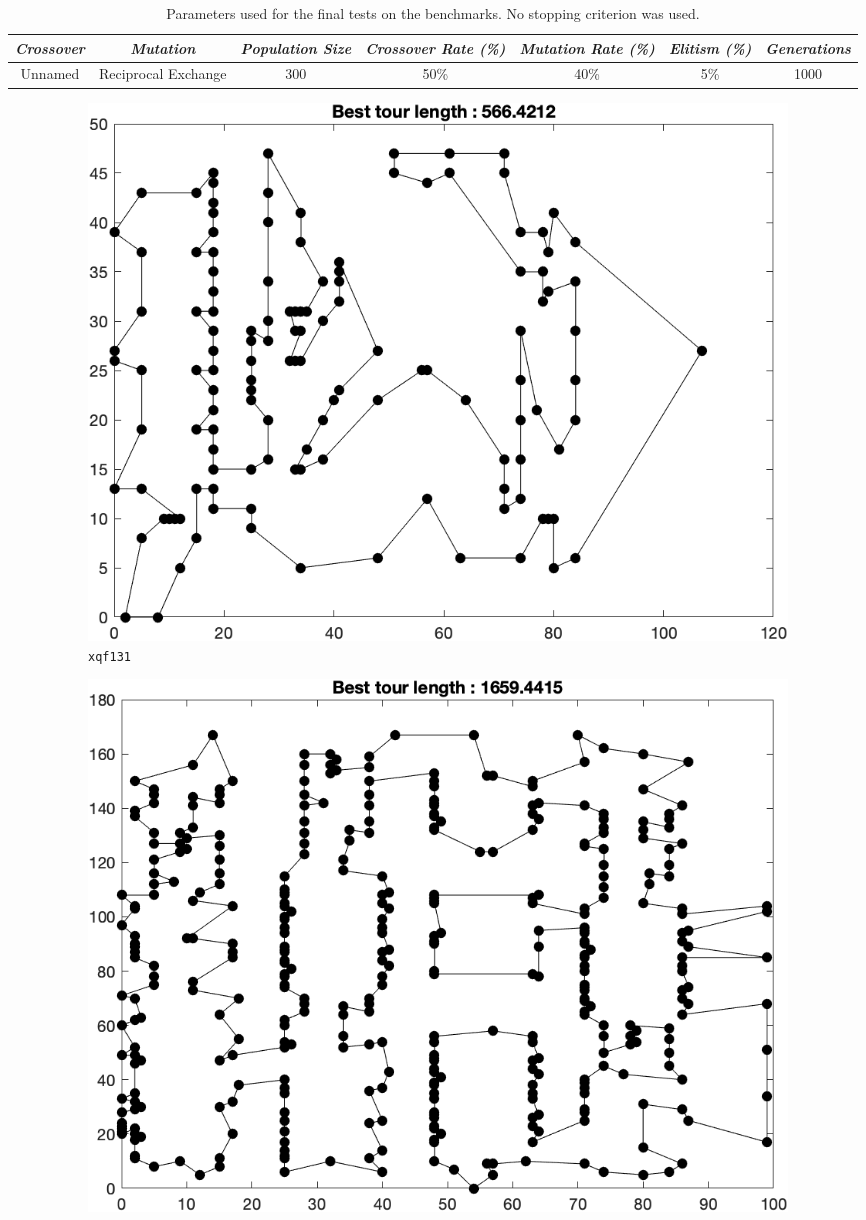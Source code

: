 \begin{table}[h]
\centering
\footnotesize
\begin{tabular}{c|c|c|c|c|c|c}
\textit{Crossover} & \textit{Mutation} & \textit{Population Size} & \textit{Crossover Rate (\%)} & \textit{Mutation Rate (\%)} & \textit{Elitism (\%)} & \textit{Generations} \\\hline 
Unnamed & Reciprocal Exchange & 300 & 50\% & 40\% & 5\% & 1000
\end{tabular}
\caption{Parameters used for the final tests on the benchmarks. No stopping criterion was used.}
\label{tab:par2}
\end{table}

\begin{figure}[H]
	\centering
%
	\begin{subfigure}[b]{0.45\textwidth}
		\centering
		\includegraphics[width=\textwidth]{benchmarks/final/xqf131.png}
		\caption{\texttt{xqf131}}
    	\end{subfigure}
	\begin{subfigure}[b]{0.45\textwidth}
		\centering
		\includegraphics[width=\textwidth]{benchmarks/final/bcl380.png}

\end{subfigure}
\end{figure}
